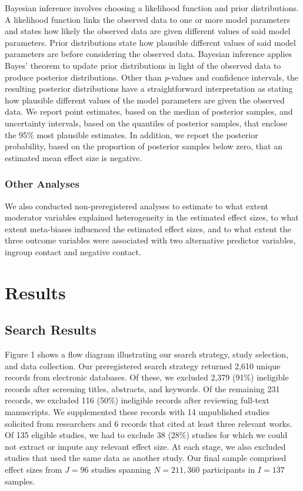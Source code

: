 \documentclass[twocolumn, 11pt, letterpaper]{article}
\begin{document}
Bayesian inference involves choosing a likelihood function and prior
distributions. A likelihood function links the observed data to one or
more model parameters and states how likely the observed data are given
different values of said model parameters. Prior distributions state how
plausible different values of said model parameters are before
considering the observed data. Bayesian inference applies Bayes' theorem
to update prior distributions in light of the observed data to produce
posterior distributions. Other than \emph{p}-values and confidence
intervals, the resulting posterior distributions have a straightforward
interpretation as stating how plausible different values of the model
parameters are given the observed data. We report point estimates, based
on the median of posterior samples, and uncertainty intervals, based on
the quantiles of posterior samples, that enclose the 95\% most plausible
estimates. In addition, we report the posterior probability, based on
the proportion of posterior samples below zero, that an estimated mean
effect size is negative.

\hypertarget{other-analyses}{%
\subsubsection{Other Analyses}\label{other-analyses}}

We also conducted non-preregistered analyses to estimate to what extent
moderator variables explained heterogeneity in the estimated effect
sizes, to what extent meta-biases influenced the estimated effect sizes,
and to what extent the three outcome variables were associated with two
alternative predictor variables, ingroup contact and negative contact.

\hypertarget{results}{%
\section{Results}\label{results}}

\hypertarget{search-results}{%
\subsection{Search Results}\label{search-results}}

Figure 1 shows a flow diagram illustrating our search strategy, study
selection, and data collection. Our preregistered search strategy
returned 2,610 unique records from electronic databases. Of these, we
excluded 2,379 (91\%) ineligible records after screening titles,
abstracts, and keywords. Of the remaining 231 records, we excluded 116
(50\%) ineligible records after reviewing full-text manuscripts. We
supplemented these records with 14 unpublished studies solicited from
researchers and 6 records that cited at least three relevant works. Of
135 eligible studies, we had to exclude 38 (28\%) studies for which we
could not extract or impute any relevant effect size. At each stage, we
also excluded studies that used the same data as another study. Our
final sample comprised effect sizes from \(J = 96\) studies spanning
\(N = 211,360\) participants in \(I = 137\) samples.
\end{document}
